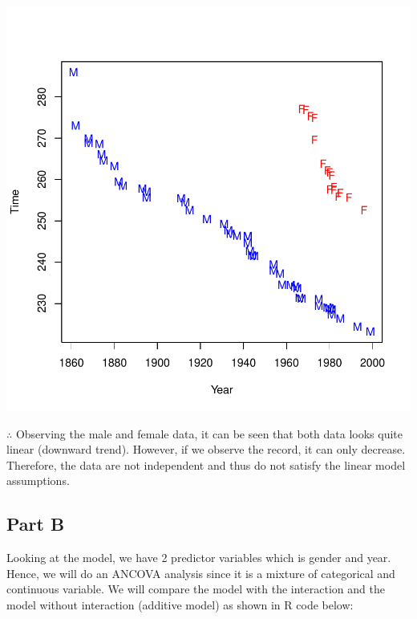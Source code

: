 \documentclass{article}
\begin{document}
\begin{Schunk}
\end{Schunk}
\includegraphics{Assignment3-007}

\noindent $\therefore$ Observing the male and female data, it can be seen that both data looks quite linear (downward trend). However, if we observe the record, it can only decrease. Therefore, the data are not independent and thus do not satisfy the linear model assumptions.

\subsection{Part B}
Looking at the model, we have 2 predictor variables which is gender and year. Hence, we will do an ANCOVA analysis since it is a mixture of categorical and continuous variable. We will compare the model with the interaction and the model without interaction (additive model) as shown in R code below:
\end{document}
